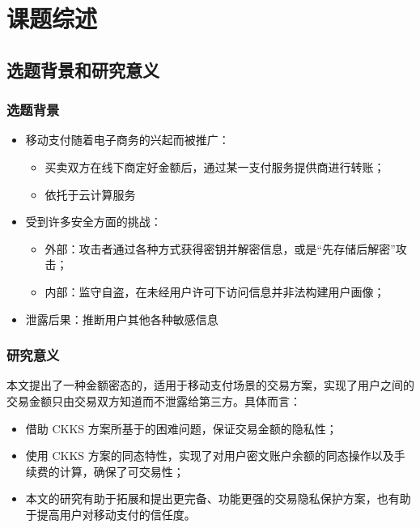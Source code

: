 \section{课题综述}

\subsection{选题背景和研究意义}

\begin{frame}
    \frametitle{选题背景}

    \begin{itemize}
        \item 移动支付随着电子商务的兴起而被推广：
        \begin{itemize}
            \item 买卖双方在线下商定好金额后，通过某一支付服务提供商进行转账；
            \item 依托于云计算服务
        \end{itemize}
        \item 受到许多安全方面的挑战：
        \begin{itemize}
            \item 外部：攻击者通过各种方式获得密钥并解密信息，或是“先存储后解密”攻击；
            \item 内部：监守自盗，在未经用户许可下访问信息并非法构建用户画像；
        \end{itemize}
        \item 泄露后果：推断用户其他各种敏感信息
    \end{itemize}

\end{frame}

\begin{frame}
    \frametitle{研究意义}

    本文提出了一种金额密态的，适用于移动支付场景的交易方案，实现了用户之间的交易金额只由交易双方知道而不泄露给第三方。具体而言：
    \begin{itemize}
        \item 借助 CKKS 方案所基于的困难问题，保证交易金额的隐私性；
        \item 使用 CKKS 方案的同态特性，实现了对用户密文账户余额的同态操作以及手续费的计算，确保了可交易性；
        \item 本文的研究有助于拓展和提出更完备、功能更强的交易隐私保护方案，也有助于提高用户对移动支付的信任度。
    \end{itemize}

\end{frame}


